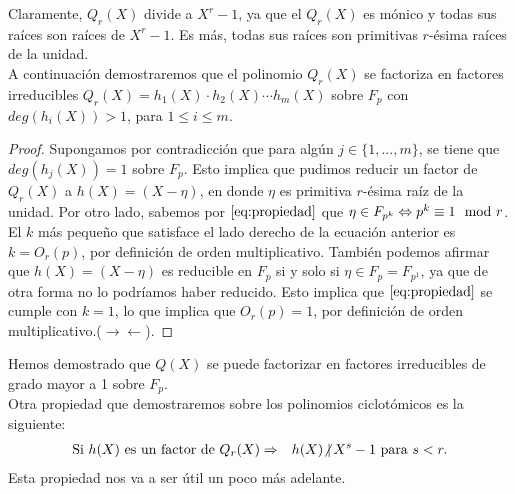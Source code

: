 	Claramente, $Q_r(X)$ divide a $X^r -1$, ya que el $Q_r(X)$ es mónico y todas sus raí­ces son raí­ces de $X^r-1$. Es más, todas sus raí­ces son primitivas $r$-ésima raí­ces de la unidad.\\
	A continuación demostraremos que el polinomio $Q_r(X)$ se factoriza en factores irreducibles $Q_r(X)=h_1(X)\cdot h_2(X)\cdots h_m(X)$ sobre $F_p$ con $deg(h_i(X))>1$, para $1\leq i \leq m$. 
	\begin{proof}
		Supongamos por contradicción que para algún $j\in \{1,...,m\}$, se tiene que $deg(h_j(X))=1$ sobre $F_p$. Esto implica que pudimos reducir un factor de $Q_r(X)$ a $h(X) = (X-\eta)$, en donde $\eta$ es primitiva $r$-ésima raí­z de la unidad. Por otro lado, sabemos por $\eqref{eq:propiedad}$ que $\eta \in F_{p^k} \Leftrightarrow p^k\equiv 1 \mod r$. El $k$ más pequeño que satisface el lado derecho de la ecuación anterior es $k = O_r(p)$, por definición de orden multiplicativo. También podemos afirmar que $h(X)=(X-\eta)$ es reducible en $F_p$ si y solo si $\eta\in F_{p}=F_{p^{1}}$, ya que de otra forma no lo podrí­amos haber reducido. Esto implica que $\eqref{eq:propiedad}$ se cumple con $k=1$, lo que implica que $O_r(p)=1$, por definición de orden multiplicativo.($\rightarrow\leftarrow$).
	\end{proof}
	Hemos demostrado que $Q(X)$ se puede factorizar en factores irreducibles de grado mayor a 1 sobre $F_p$.\\
	Otra propiedad que demostraremos sobre los polinomios ciclotómicos es la siguiente:
	\begin{eqnarray}
		\text{Si }h(X)\text{ es un factor de }Q_r(X)&\Rightarrow &h(X)\text{$\not|$}\hspace{1.8pt} X^s-1 \text{ para }s<r.\label{eq:final4.7}
	\end{eqnarray} 
	Esta propiedad nos va a ser útil un poco más adelante.	 

